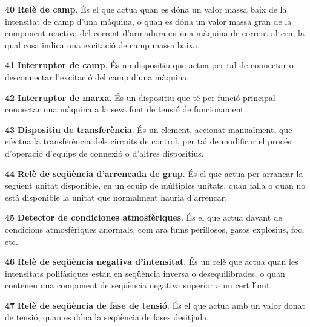 \begin{multicols}{2}
\begin{list}{}
\item[\textbf{40}]  \textbf{Rel\`{e} de camp}. \'{E}s el que actua quan es
d\'{o}na un valor massa baix de la intensitat de camp d'una m\`{a}quina, o quan es d\'{o}na un valor
massa gran de la component reactiva del corrent d'armadura en una m\`{a}quina de corrent
altern, la qual cosa indica una excitaci\'{o} de camp massa baixa.

\item[\textbf{41}]  \textbf{Interruptor de camp}. \'{E}s un dispositiu
que actua per tal de connectar o desconnectar l'excitaci\'{o} del camp
d'una m\`{a}quina.

\item[\textbf{42}]  \textbf{Interruptor de marxa}. \'{E}s un
dispositiu que t\'{e} per funci\'{o} principal connectar una m\`{a}quina a la
seva font de tensi\'{o} de funcionament.

\item[\textbf{43}]  \textbf{Dispositiu de transfer\`{e}ncia}. \'{E}s
un element, accionat manualment, que efectua la transfer\`{e}ncia dels circuits de control, per tal
 de modificar el proc\'{e}s d'operaci\'{o} d'equips de connexi\'{o} o d'altres dispositius.

\item[\textbf{44}]  \textbf{Rel\`{e} de seq\"{u}\`{e}ncia
d'arrencada de grup}. \'{E}s el que actua per arrancar la seg\"{u}ent unitat
disponible, en un equip de m\'{u}ltiples unitats, quan falla o quan no
est\`{a} disponible la unitat que normalment hauria d'arrencar.

\item[\textbf{45}]  \textbf{Detector de condiciones
atmosf\`{e}riques}. \'{E}s el que actua davant de condicions atmosf\`{e}riques anormals, com ara fums
perillosos, gasos explosius, foc, etc.

\item[\textbf{46}]  \textbf{Rel\`{e} de
seq\"{u}\`{e}ncia negativa d'intensitat}. \'{E}s un rel\`{e} que actua quan les
intensitats polif\`{a}siques estan en seq\"{u}\`{e}ncia inversa o
desequilibrades, o quan contenen una component de seq\"{u}\`{e}ncia negativa
superior a un cert l\'{\i}mit.

\item[\textbf{47}]  \textbf{Rel\`{e}
de seq\"{u}\`{e}ncia de fase de tensi\'{o}}. \'{E}s el que actua amb un valor donat
de tensi\'{o}, quan es d\'{o}na la seq\"{u}\`{e}ncia de fases desitjada.


\end{list}
\end{multicols}
